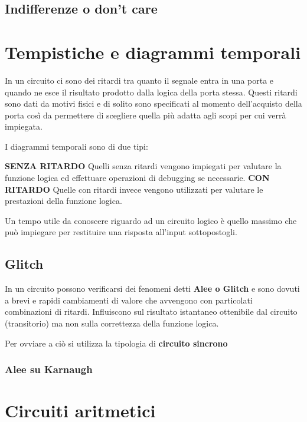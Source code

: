 \documentclass{book}
\begin{document}
\section{Indifferenze o don't care}

\chapter{Tempistiche e diagrammi temporali}

In un circuito ci sono dei ritardi tra quanto il segnale entra in una porta e quando ne esce il risultato prodotto dalla logica della porta stessa.
Questi ritardi sono dati da motivi fisici e di solito sono specificati al momento dell'acquisto della porta così da permettere di scegliere quella più adatta agli scopi per cui verrà impiegata.

I diagrammi temporali sono di due tipi:
 
\textbf{SENZA RITARDO}\newline
Quelli senza ritardi vengono impiegati per valutare la funzione logica ed effettuare operazioni di debugging se necessarie.\newline
\textbf{CON RITARDO}\newline
Quelle con ritardi invece vengono utilizzati per valutare le prestazioni della funzione logica.\newline

Un tempo utile da conoscere riguardo ad un circuito logico è quello massimo che può impiegare per restituire una risposta all'input sottopostogli.

\section{Glitch}

In un circuito possono verificarsi dei fenomeni detti \textbf{Alee o Glitch} e sono dovuti a brevi e rapidi cambiamenti di valore che avvengono con particolati combinazioni di ritardi. Influiscono sul risultato istantaneo ottenibile dal circuito (transitorio) ma non sulla correttezza della funzione logica.


Per ovviare a ciò si utilizza la tipologia di\textbf{ circuito sincrono}

\subsection{Alee su Karnaugh}

\chapter{Circuiti aritmetici}
\end{document}
